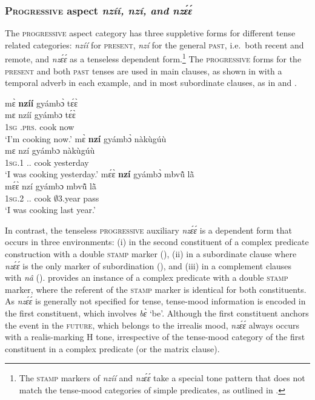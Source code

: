 \subsubsection{\textsc{Progressive} aspect {\itshape nzíí, nzí, and nzɛ́ɛ́}}
\label{sec:PROG}

The \textsc{progressive} aspect category has three suppletive forms for different tense related categories: {\itshape nzíí} for \textsc{present}, {\itshape nzí} for the general \textsc{past}, i.e.\ both recent and remote, and {\itshape nzɛ́ɛ́} as a tenseless dependent form.\footnote{The \textsc{stamp} markers of {\itshape nzíí} and {\itshape nzɛ́ɛ́ } take a special tone pattern that does not match the tense-mood categories of simple predicates, as outlined in .}
The \textsc{progressive} forms for the \textsc{present} and both \textsc{past} tenses are used in main clauses, as shown in  with a temporal adverb in each example, and in most subordinate clauses, as in  and .

\ea\label{proga}
\ea \label{proga1}
  \glll     mɛ̀ {\bfseries nzíí} gyámbɔ̀ tɛ́ɛ̀ \\
           mɛ nzíí gyámbɔ tɛ́ɛ̀ \\
              1\textsc{sg} {\PROG}.\textsc{prs}.{\R} cook now\\
    \trans `I'm cooking now.'
\ex\label{proga2}
  \glll   mɛ̀ {\bfseries nzí} gyámbɔ̀ nàkùgúù \\
          mɛ nzí gyámbɔ nàkùgúù \\
              1\textsc{sg}.{\PST}1 {\PROG}.{\PST}.{\R} cook yesterday\\
    \trans `I was cooking yesterday.'
\ex\label{proga3}
  \glll   mɛ́ɛ̀ {\bfseries nzí} gyámbɔ̀ mbvũ̂ lã̀ \\
          mɛ́ɛ̀ nzí gyámbɔ mbvũ̂ lã̀ \\
              1\textsc{sg}.{\PST}2 {\PROG}.{\PST}.{\R} cook $\emptyset$3.year pass\\
    \trans `I was cooking last year.'
\z
\z

In contrast, the tenseless \textsc{progressive} auxiliary {\itshape nzɛ́ɛ́} is a dependent form that occurs in three environments: (i) in the second constituent of a complex predicate construction with a double \textsc{stamp} marker (), (ii) in a subordinate clause where {\itshape nzɛ́ɛ́} is the only marker of subordination (), and (iii) in a complement clauses with {\itshape nâ} ().   provides an instance of a complex predicate with a double \textsc{stamp} marker, where the referent of the \textsc{stamp} marker is identical for both constituents. As {\itshape nzɛ́ɛ́} is generally not specified for tense, tense-mood information is encoded in the first constituent, which involves {\itshape bɛ̀} `be'. Although the first constituent anchors the event in the \textsc{future}, which belongs to the irrealis mood, {\itshape nzɛ́ɛ́} always occurs with a realis-marking H tone, irrespective of the tense-mood category of the first constituent in a complex predicate (or the matrix clause).

